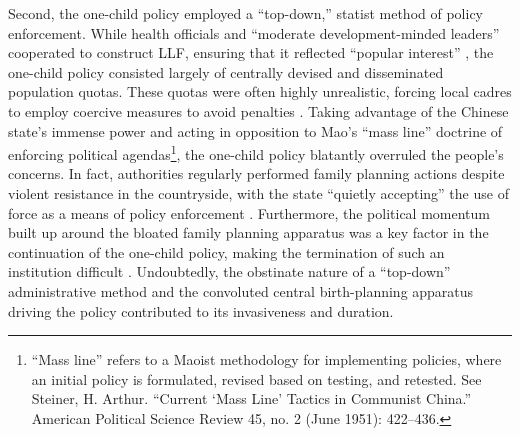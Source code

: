 \documentclass[12pt, a4paper, twoside]{article}
\begin{document}
Second, the one-child policy employed a “top-down,” statist method of policy enforcement. While health officials and “moderate development-minded leaders” cooperated to construct LLF, ensuring that it reflected “popular interest” \autocite[p.\ 66]{Greenhalgh2008JustOneChild}, the one-child policy consisted largely of centrally devised and disseminated population quotas. These quotas were often highly unrealistic, forcing local cadres to employ coercive measures to avoid penalties \autocite[pp.\ 155, 164]{LiXiaorong2015LicenseToCoerce}. Taking advantage of the Chinese state’s immense power and acting in opposition to Mao’s “mass line” doctrine of enforcing political agendas\footnote{“Mass line” refers to a Maoist methodology for implementing policies, where an initial policy is formulated, revised based on testing, and retested. See Steiner, H. Arthur. “Current ‘Mass Line’ Tactics in Communist China.” American Political Science Review 45, no. 2 (June 1951): 422–436.}, the one-child policy blatantly overruled the people’s concerns. In fact, authorities regularly performed family planning actions despite violent resistance in the countryside, with the state “quietly accepting” the use of force as a means of policy enforcement \autocite[p.\ 166]{Greenhalgh2008JustOneChild}. Furthermore, the political momentum built up around the bloated family planning apparatus was a key factor in the continuation of the one-child policy, making the termination of such an institution difficult \autocite[p.\ 126]{FengCaiGu2013}. Undoubtedly, the obstinate nature of a “top-down” administrative method and the convoluted central birth-planning apparatus driving the policy contributed to its invasiveness and duration. 
\end{document}
